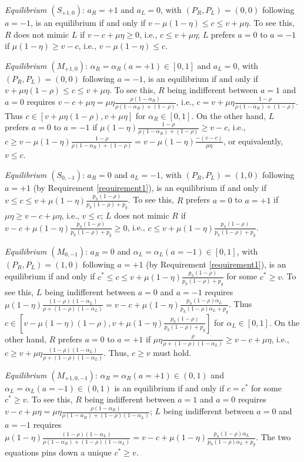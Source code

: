 \documentclass[english,12pt]{article}
\theoremstyle{plain}
\theoremstyle{plain}
\theoremstyle{definition}
\theoremstyle{definition}
\theoremstyle{assumption}
\theoremstyle{plain}
\theoremstyle{plain}
\theoremstyle{plain}
\theoremstyle{plain}
\theoremstyle{definition}%
\theoremstyle{plain}
\theoremstyle{plain}
\theoremstyle{plain}
\theoremstyle{plain}
\theoremstyle{plain}
\theoremstyle{plain}
\begin{document}
\textit{Equilibrium $(S_{+1,0})$}: $a_R=+1$ and $a_L=0$, with $(P_R,P_L)=(0,0)$ following $a=-1$, is an equilibrium if and only if $v-\mu(1-\eta)\leq c\leq v+\mu\eta$. To see this, $R$ does not mimic $L$ if $v-c+\mu\eta\geq 0$, i.e., $c\leq v+\mu\eta$; $L$ prefers $a=0$ to $a=-1$ if $\mu(1-\eta)\geq v-c$, i.e., $v-\mu(1-\eta)\leq c$.

\textit{Equilibrium $(M_{+1,0})$}: $\alpha_R = \alpha_R(a=+1)\in [0,1]$ and $a_L=0$, with $(P_R,P_L)=(0,0)$ following $a=-1$, is an equilibrium if and only if $v+\mu\eta(1-\rho)\leq c\leq v+\mu\eta$. To see this, $R$ being indifferent between $a=1$ and $a=0$ requires $v-c+\mu\eta = \mu\eta\frac{\rho (1-\alpha_R)}{\rho(1-\alpha_R)+(1-\rho)}$, i.e., $c = v+\mu\eta\frac{1-\rho}{\rho(1-\alpha_R)+(1-\rho)}$. Thus $c\in [v+\mu\eta(1-\rho), v+\mu\eta]$ for $\alpha_R\in[0,1]$. On the other hand, $L$ prefers $a=0$ to $a=-1$ if $\mu(1-\eta)\frac{1-\rho}{\rho(1-\alpha_R) + (1-\rho)}\geq v-c$, i.e., $c\geq v-\mu(1-\eta)\frac{1-\rho}{\rho(1-\alpha_R)+(1-\rho)} = v-\mu(1-\eta)\frac{-(v-c)}{\mu\eta}$, or equivalently, $v\leq c$.


\textit{Equilibrium $(S_{0,-1})$}: $a_R=0$ and $a_L=-1$, with $(P_R,P_L)=(1,0)$ following $a=+1$ (by Requirement \ref{requirement1}), is an equilibrium if and only if $v\leq c\leq v+\mu(1-\eta)\frac{p_h(1-\rho)}{p_h(1-\rho)+p_g}$. To see this, $R$ prefers $a=0$ to $a=+1$ if $\mu\eta\geq v-c+\mu\eta$, i.e., $v\leq c$; $L$ does not mimic $R$ if $v-c+\mu(1-\eta)\frac{p_h(1-\rho)}{p_h(1-\rho)+p_g}\geq 0$, i.e., $c\leq v+\mu(1-\eta)\frac{p_h(1-\rho)}{p_h(1-\rho)+p_g}$. 

\textit{Equilibrium $(M_{0,-1})$}: $a_R=0$ and $\alpha_L=\alpha_L(a=-1)\in[0,1]$, with $(P_R,P_L)=(1,0)$ following $a=+1$ (by Requirement \ref{requirement1}), is an equilibrium if and only if $c^*\leq c\leq v+\mu(1-\eta)\frac{p_h(1-\rho)}{p_h(1-\rho)+p_g}$ for some $c^*\geq v$. To see this, $L$ being indifferent between $a=0$ and $a=-1$ requires $\mu(1-\eta)\frac{(1-\rho)(1-\alpha_L)}{\rho+(1-\rho)(1-\alpha_L)} = v-c+\mu(1-\eta)\frac{p_h(1-\rho)\alpha_L}{p_h(1-\rho)\alpha_L+p_g}$. Thus $c\in [v-\mu(1-\eta)(1-\rho), v+\mu(1-\eta)\frac{p_h(1-\rho)}{p_h(1-\rho)+p_g}]$ for $\alpha_L\in[0,1]$. On the other hand, $R$ prefers $a=0$ to $a=+1$ if $\mu\eta\frac{\rho}{\rho+(1-\rho)(1-\alpha_L)}\geq v-c+\mu\eta$, i.e., $c\geq v+\mu\eta\frac{(1-\rho)(1-\alpha_L)}{\rho+(1-\rho)(1-\alpha_L)}$. Thus, $c\geq v$ must hold.


\textit{Equilibrium $(M_{+1,0,-1})$}: $\alpha_R=\alpha_R(a=+1)\in(0,1)$ and $\alpha_L=\alpha_L(a=-1)\in(0,1)$ is an equilibrium if and only if $c = c^*$ for some $c^*\geq v$. To see this, $R$ being indifferent between $a=1$ and $a=0$ requires $v-c+\mu\eta = \mu\eta\frac{\rho (1-\alpha_R)}{\rho(1-\alpha_R)+(1-\rho)(1-\alpha_L)}$; $L$ being indifferent between $a=0$ and $a=-1$ requires $\mu(1-\eta)\frac{(1-\rho)(1-\alpha_L)}{\rho(1-\alpha_R)+(1-\rho)(1-\alpha_L)} = v-c+\mu(1-\eta)\frac{p_h(1-\rho)\alpha_L}{p_h(1-\rho)\alpha_L+p_g}$. The two equations pins down a unique $c^*\geq v$.
\end{document}
